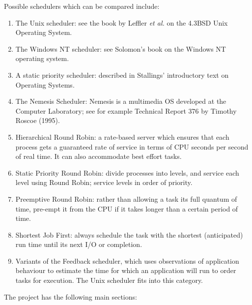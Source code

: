 \documentclass[12pt]{article}
\begin{document}
Possible schedulers which can be compared include: 

\begin{enumerate}

\item The Unix scheduler: see the book by Leffler \emph{et al.} on the
  4.3BSD Unix Operating System.

\item The Windows NT scheduler: see Solomon's book on the Windows
  NT operating system.

\item A static priority scheduler: described in Stallings'
  introductory text on Operating Systems.

\item The Nemesis Scheduler: Nemesis is a multimedia OS developed at
  the Computer Laboratory; see for example Technical Report 376 by
  Timothy Roscoe (1995).

\item Hierarchical Round Robin: a rate-based server which ensures
  that each process gets a guaranteed rate of service in terms of CPU
  seconds per second of real time.  It can also accommodate best
  effort tasks.

\item Static Priority Round Robin: divide processes into levels,
  and service each level using Round Robin; service levels in order of
  priority.

\item Preemptive Round Robin: rather than allowing a task its full
  quantum of time, pre-empt it from the CPU if it takes longer than a
  certain period of time.

\item Shortest Job First: always schedule the task with the
  shortest (anticipated) run time until its next I/O or completion.

\item Variants of the Feedback scheduler, which uses observations
  of application behaviour to estimate the time for which an
  application will run to order tasks for execution.  The Unix
  scheduler fits into this category.

\end{enumerate}

The project has the following main sections:
\end{document}
